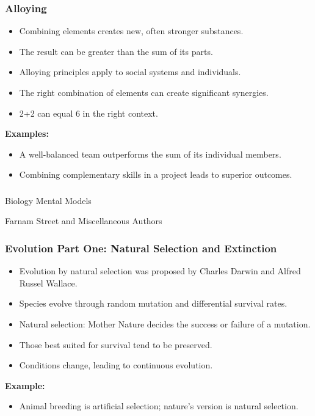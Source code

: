 \begin{frame}[fragile]\frametitle{Alloying}
\begin{itemize}
    \item Combining elements creates new, often stronger substances.
    \item The result can be greater than the sum of its parts.
    \item Alloying principles apply to social systems and individuals.
    \item The right combination of elements can create significant synergies.
    \item 2+2 can equal 6 in the right context.
\end{itemize}
\textbf{Examples:}
\begin{itemize}
    \item A well-balanced team outperforms the sum of its individual members.
    \item Combining complementary skills in a project leads to superior outcomes.
\end{itemize}
\end{frame}

\begin{frame}[fragile]\frametitle{}
\begin{center}
{\Large Biology Mental Models}

{\tiny Farnam Street and Miscellaneous Authors }


\end{center}
\end{frame}


\begin{frame}[fragile]\frametitle{Evolution Part One: Natural Selection and Extinction}
\begin{itemize}
    \item Evolution by natural selection was proposed by Charles Darwin and Alfred Russel Wallace.
    \item Species evolve through random mutation and differential survival rates.
    \item Natural selection: Mother Nature decides the success or failure of a mutation.
    \item Those best suited for survival tend to be preserved.
    \item Conditions change, leading to continuous evolution.
\end{itemize}
\textbf{Example:}
\begin{itemize}
    \item Animal breeding is artificial selection; nature's version is natural selection.
\end{itemize}
\end{frame}

